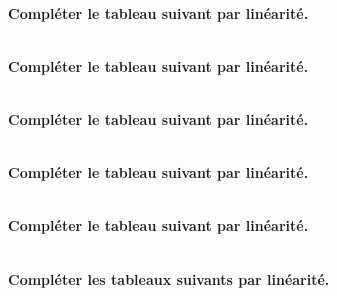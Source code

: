 






\exercice \diff[3]  \\
\textbf{Compléter le tableau suivant par linéarité.}

\exercice \diff[3] \\
\textbf{Compléter le tableau suivant par linéarité.}

\exercice \diff[3] \\
\textbf{Compléter le tableau suivant par linéarité.}


\exercice \diff[3] \\
\textbf{Compléter le tableau suivant par linéarité.}

\exercice \diff[3] \\
\textbf{Compléter le tableau suivant par linéarité.}

\newpage%

\exercice \diff[4] \\
\textbf{Compléter les tableaux suivants par linéarité.}
\mc{


\columnbreak


}

